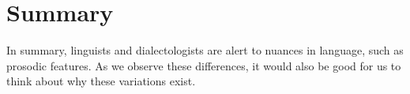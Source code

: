 \documentclass[../main.tex]{subfiles}
\begin{document}

        \section{Summary}
        In summary, linguists and dialectologists are alert to nuances in language, such as prosodic features. As we observe these differences, it would also be good for us to think about why these variations exist.
\end{document}

